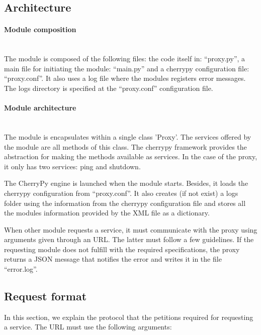 \subsection{Architecture}

\paragraph{Module composition} \hspace{0pt} \\
The module is composed of the following files: the code itself in: “proxy.py”, a main file for initiating the module: “main.py” and a cherrypy configuration file: “proxy.conf”. It also uses a log file where the modules registers error messages. The logs directory is specified at the ``proxy.conf” configuration file.

\paragraph{Module architecture} \hspace{0pt} \\

The module is encapsulates within a single class ’Proxy’. The services offered by the module are all methods of this class. The cherrypy framework provides the abstraction for making the methods available as services. In the case of the proxy, it only has two services: ping and shutdown.

The CherryPy engine is launched when the module starts. Besides, it loads the cherrypy configuration from “proxy.conf”. It also creates (if not exist) a logs folder using the information from the cherrypy configuration file and stores all the modules information provided by the XML file as a dictionary.

When other module requests a service, it must communicate with the proxy using arguments given through an URL. The latter must follow a few guidelines. If the requesting module does not fulfill with the required specifications, the proxy returns a JSON message that notifies the error and writes it in the file “error.log”.

\subsection{Request format}
\label{sec:request_format}

In this section, we explain the protocol that the petitions required for requesting a service. The URL must use the following arguments:

